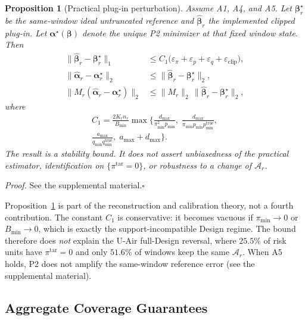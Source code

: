 \documentclass[letterpaper,journal]{IEEEtran}
\newtheorem{proposition}{Proposition}
\begin{document}
\begin{proposition}[Practical plug-in perturbation]
\label{prop:practical_plugin}
Assume A1, A4, and A5.  Let $\boldsymbol\beta_r^\star$ be the
same-window ideal untruncated reference and
$\widehat{\boldsymbol\beta}_r$ the implemented clipped plug-in.  Let
$\boldsymbol\alpha^\star(\boldsymbol\beta)$ denote the unique P2 minimizer
at that fixed window state.  Then
\begin{align}
\bigl\|\widehat{\boldsymbol\beta}_r-\boldsymbol\beta_r^\star\bigr\|_1
&\le
C_1\bigl(\varepsilon_\pi+\varepsilon_p+\varepsilon_q+\varepsilon_{\mathrm{clip}}\bigr),
\label{eq:g4_beta}\\
\bigl\|\widehat{\boldsymbol\alpha}_r-\boldsymbol\alpha_r^\star\bigr\|_2
&\le
\bigl\|\widehat{\boldsymbol\beta}_r-\boldsymbol\beta_r^\star\bigr\|_2,
\label{eq:g4_alpha}\\
\bigl\|M_r(\widehat{\boldsymbol\alpha}_r-\boldsymbol\alpha_r^\star)\bigr\|_2
&\le
\|M_r\|_2\,
\bigl\|\widehat{\boldsymbol\beta}_r-\boldsymbol\beta_r^\star\bigr\|_2,
\label{eq:g4_comp}
\end{align}
where
\begin{multline}
C_1
=
\frac{2K_r n_r}{B_{\min}}
\max\Biggl\{
\frac{d_{\max}}{\pi_{\min}^2 p_{\min}},\;
\frac{d_{\max}}{\pi_{\min}p_{\min}p_{\min}^{\mathrm{true}}},\\
\frac{a_{\max}}{q_{\min}q_{\min}^{\mathrm{true}}},\;
a_{\max}+d_{\max}
\Biggr\}.
\label{eq:g4_c1}
\end{multline}
The result is a stability bound.  It does not assert unbiasedness of the
practical estimator, identification on $\{\pi^{\mathrm{tar}}=0\}$, or
robustness to a change of $\mathcal{A}_r$.
\end{proposition}

\noindent\emph{Proof.}
See the supplemental material.\hfill$\square$

Proposition~\ref{prop:practical_plugin} is part of the reconstruction
and calibration theory, not a fourth contribution.  The constant
$C_1$ is conservative: it becomes vacuous if $\pi_{\min}\to0$ or
$B_{\min}\to0$, which is exactly the support-incompatible Design regime.
The bound therefore does \emph{not} explain the U-Air full-Design
reversal, where $25.5\%$ of risk units have $\pi^{\mathrm{tar}}=0$ and
only $51.6\%$ of windows keep the same $\mathcal{A}_r$.  When A5 holds,
P2 does not amplify the same-window reference error
(see the supplemental material).

\subsection{Aggregate Coverage Guarantees}
\label{subsec:agg_coverage_theory}
\end{document}
